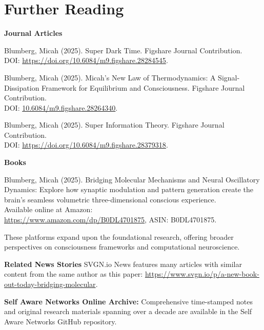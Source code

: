 \documentclass[american,11pt,letterpaper]{article}
\def\emph#1{#1}%
\begin{document}
\setcounter{subsection}{0}
\renewcommand{\thesection}{}
\renewcommand{\thesubsection}{.\arabic{subsection}}
\section*{Further Reading}

\textbf{Journal Articles}

\noindent Blumberg, Micah (2025). \emph{Super Dark Time}. Figshare Journal Contribution.\\DOI: \href{https://doi.org/10.6084/m9.figshare.28284545}{https://doi.org/10.6084/m9.figshare.28284545}.

\medskip
\noindent Blumberg, Micah (2025). \emph{Micah's New Law of Thermodynamics: A Signal-Dissipation Framework for Equilibrium and Consciousness}. Figshare Journal Contribution.\\DOI: \href{https://doi.org/10.6084/m9.figshare.28264340}{10.6084/m9.figshare.28264340}.

\medskip
\noindent Blumberg, Micah (2025). \emph{Super Information Theory}. Figshare Journal Contribution.\\DOI: \href{https://doi.org/10.6084/m9.figshare.28379318}{https://doi.org/10.6084/m9.figshare.28379318}.

\medskip
\noindent \textbf{Books}

\noindent Blumberg, Micah (2025). \emph{Bridging Molecular Mechanisms and Neural Oscillatory Dynamics: Explore how synaptic modulation and pattern generation create the brain's seamless volumetric three-dimensional conscious experience}. \\Available online at Amazon:\\ \href{https://www.amazon.com/dp/B0DL4701875}{https://www.amazon.com/dp/B0DL4701875}, ASIN: B0DL4701875.

\medskip
\noindent These platforms expand upon the foundational research, offering broader perspectives on consciousness frameworks and computational neuroscience.

\medskip

\noindent \textbf{Related News Stories}
\noindent SVGN.io News features many articles with similar content from the same author as this paper: \href{https://www.svgn.io/p/a-new-book-out-today-bridging-molecular}{https://www.svgn.io/p/a-new-book-out-today-bridging-molecular}.

\medskip

\noindent \textbf{Self Aware Networks Online Archive:} Comprehensive time-stamped notes and original research materials spanning over a decade are available in the Self Aware Networks GitHub repository.
\end{document}
